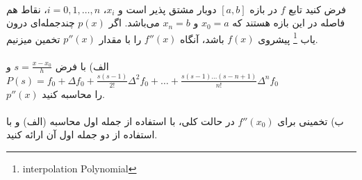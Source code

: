 \\
فرض کنید تابع \( f \) در بازه  \([a, b]\) دوبار مشتق پذیر است و \( x_i \)، \( i = 0, 1, \ldots , n\)، نقاط هم فاصله در این بازه‌ هستند که \( x_0 = a\) و \( x_n = b\) می‌باشد. اگر \( p(x) \) چندجمله‌ای درون یاب
\footnote{interpolation Polynomial}
پیشروی \( f(x) \) باشد، آنگاه \( f''(x) \) را با مقدار \( p''(x) \) تخمین میزنیم.
\\
\\
الف) با فرض \( s = \frac{{x - x_0}}{{h}} \) و \( P(s) = f_0 + \Delta f_0 + \frac{{s(s - 1)}}{{2!}}\Delta^2 f_0 + \ldots + \frac{{s(s-1)\ldots(s-n+1)}}{{n!}}\Delta^n f_0 \)
\\
\(p''(x)\) را محاسبه کنید.
\\
\\
ب) تخمینی برای \( f''(x_0) \) در حالت کلی، با استفاده از جمله اول محاسبه (الف) و با استفاده از دو جمله اول آن ارائه کنید.
